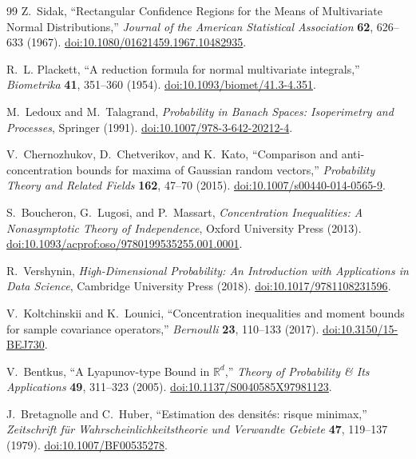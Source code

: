 \documentclass[a4paper,onecolumn,unpublished,nopdfoutputerror]{quantumarticle}
\theoremstyle{plain}
\theoremstyle{definition}
\newcommand{\1}{\mathbf{1}}
\begin{document}
\begin{thebibliography}{99}
Z.~Sidak,
``Rectangular Confidence Regions for the Means of Multivariate Normal Distributions,''
\emph{Journal of the American Statistical Association} \textbf{62}, 626--633 (1967). \href{https://doi.org/10.1080/01621459.1967.10482935}{doi:10.1080/01621459.1967.10482935}.

R.~L. Plackett,
``A reduction formula for normal multivariate integrals,''
\emph{Biometrika} \textbf{41}, 351--360 (1954). \href{https://doi.org/10.1093/biomet/41.3-4.351}{doi:10.1093/biomet/41.3-4.351}.

M.~Ledoux and M.~Talagrand,
\emph{Probability in Banach Spaces: Isoperimetry and Processes},
Springer (1991). \href{https://doi.org/10.1007/978-3-642-20212-4}{doi:10.1007/978-3-642-20212-4}.

V.~Chernozhukov, D.~Chetverikov, and K.~Kato,
``Comparison and anti-concentration bounds for maxima of Gaussian random vectors,''
\emph{Probability Theory and Related Fields} \textbf{162}, 47--70 (2015). \href{https://doi.org/10.1007/s00440-014-0565-9}{doi:10.1007/s00440-014-0565-9}.

S.~Boucheron, G.~Lugosi, and P.~Massart,
\emph{Concentration Inequalities: A Nonasymptotic Theory of Independence},
Oxford University Press (2013). \href{https://doi.org/10.1093/acprof:oso/9780199535255.001.0001}{doi:10.1093/acprof:oso/9780199535255.001.0001}.

R.~Vershynin,
\emph{High-Dimensional Probability: An Introduction with Applications in Data Science},
Cambridge University Press (2018). \href{https://doi.org/10.1017/9781108231596}{doi:10.1017/9781108231596}.

V.~Koltchinskii and K.~Lounici,
``Concentration inequalities and moment bounds for sample covariance operators,''
\emph{Bernoulli} \textbf{23}, 110--133 (2017). \href{https://doi.org/10.3150/15-BEJ730}{doi:10.3150/15-BEJ730}.


V.~Bentkus,
``A Lyapunov-type Bound in $\mathbb{R}^d$,''
\emph{Theory of Probability \& Its Applications} \textbf{49}, 311--323 (2005). \href{https://doi.org/10.1137/S0040585X97981123}{doi:10.1137/S0040585X97981123}.

J.~Bretagnolle and C.~Huber,
``Estimation des densit\'es: risque minimax,''
\emph{Zeitschrift f\"ur Wahrscheinlichkeitstheorie und Verwandte Gebiete} \textbf{47}, 119--137 (1979). \href{https://doi.org/10.1007/BF00535278}{doi:10.1007/BF00535278}.


\end{thebibliography}
\end{document}
